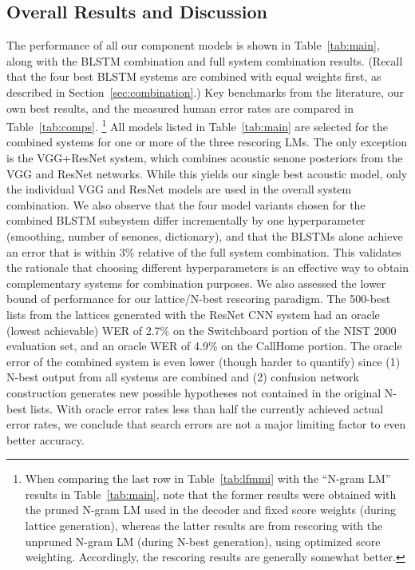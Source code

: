 \documentclass{article}
\begin{document}
\subsection{Overall Results and Discussion}
\label{sec:compare}
The performance of all our component models 
is shown in Table~\ref{tab:main}, along with the BLSTM combination and full system combination results.
(Recall that the four best BLSTM systems are combined with equal weights first,
as described in Section~\ref{sec:combination}.)
Key benchmarks from the literature, our own best results, and the measured human error rates are compared in
Table~\ref{tab:comps}.%
\footnote{When comparing the last row in Table~\ref{tab:lfmmi} with the ``N-gram LM'' results in Table~\ref{tab:main},
note that the former results were obtained with the pruned N-gram LM used in the decoder and
fixed score weights (during lattice generation),
whereas the latter results are from rescoring with the unpruned N-gram LM (during N-best generation),
using optimized score weighting.  Accordingly, the rescoring results are generally somewhat better.}
All models listed in Table~\ref{tab:main} are selected for the combined systems
for one or more of the three rescoring LMs.
The only exception is the VGG+ResNet system, which combines acoustic senone posteriors from the VGG and ResNet networks.
While this yields our single best acoustic model, only the individual VGG and ResNet models are used in the
overall system combination.
We also observe that the four model variants chosen for the combined BLSTM subsystem differ incrementally by
one hyperparameter (smoothing, number of senones, dictionary), and that the BLSTMs alone achieve an error
that is within 3\% relative of the full system combination.
This validates the rationale that choosing different hyperparameters is an effective way to obtain complementary
systems for combination purposes.
We also assessed the lower bound of performance for our lattice/N-best rescoring paradigm.
The 500-best lists from the lattices generated with the ResNet CNN system
had an oracle (lowest achievable) WER of 2.7\% on the Switchboard portion of the NIST 2000 evaluation set,
and an oracle WER of 4.9\% on the CallHome portion.
The oracle error of the combined system is even lower (though harder to quantify) since (1) N-best output from all 
systems are combined and (2) confusion network construction generates new possible hypotheses not contained
in the original N-best lists.
With oracle error rates less than half the currently achieved actual error rates,
we conclude that search errors are not a major limiting factor to even better accuracy.
\end{document}
